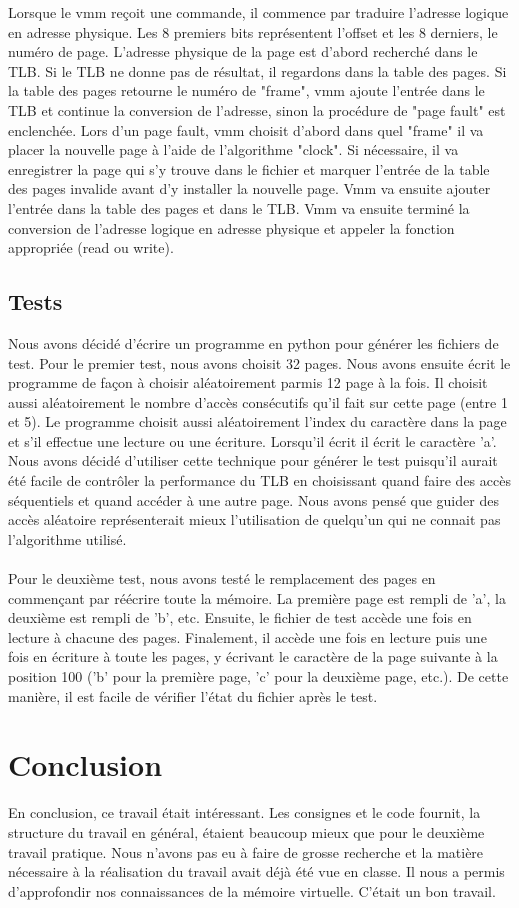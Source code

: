 \documentclass{article}
\begin{document}
Lorsque le vmm reçoit une commande, il commence par traduire l'adresse logique 
en adresse physique. Les 8 premiers bits représentent l'offset et les 8 
derniers, le numéro de page. L'adresse physique de la page est d'abord 
recherché dans le TLB. Si le TLB ne donne pas de résultat, il regardons dans 
la table des pages. Si la table des pages retourne le numéro de "frame", vmm 
ajoute l'entrée dans le TLB et continue la conversion de l'adresse, sinon la 
procédure de "page fault" est enclenchée. Lors d'un page fault, vmm choisit 
d'abord dans quel "frame" il va placer la nouvelle page à l'aide de 
l'algorithme "clock". Si nécessaire, il va enregistrer la page qui s'y trouve 
dans le fichier et marquer l'entrée de la table des pages invalide avant d'y 
installer la nouvelle page. Vmm va ensuite ajouter l'entrée dans la table des 
pages et dans le TLB. Vmm va ensuite terminé la conversion de l'adresse 
logique en adresse physique et appeler la fonction appropriée (read ou write).

\subsection{Tests}

Nous avons décidé d'écrire un programme en python pour générer les fichiers de 
test. Pour le premier test, nous avons choisit 32 pages. Nous avons ensuite 
écrit le programme de façon à choisir aléatoirement parmis 12 page à la fois. 
Il choisit aussi aléatoirement le nombre d'accès consécutifs qu'il fait sur 
cette page (entre 1 et 5). Le programme choisit aussi aléatoirement l'index du 
caractère dans la page et s'il effectue une lecture ou une écriture. Lorsqu'il 
écrit il écrit le caractère 'a'. Nous avons décidé d'utiliser cette technique 
pour générer le test puisqu'il aurait été facile de contrôler la performance 
du TLB en choisissant quand faire des accès séquentiels et quand accéder à une 
autre page. Nous avons pensé que guider des accès aléatoire représenterait 
mieux l'utilisation de quelqu'un qui ne connait pas l'algorithme utilisé.\\\\
Pour le deuxième test, nous avons testé le remplacement des pages en 
commençant par réécrire toute la mémoire. La première page est rempli de 'a', 
la deuxième est rempli de 'b', etc. Ensuite, le fichier de test accède une 
fois en lecture à chacune des pages. Finalement, il accède une fois en lecture 
puis une fois en écriture à toute les pages, y écrivant le caractère de la 
page suivante à la position 100 ('b' pour la première page, 'c' pour la 
deuxième page, etc.). De cette manière, il est facile de vérifier l'état du 
fichier après le test.


\section{Conclusion}
En conclusion, ce travail était intéressant. Les consignes et le code fournit, 
la structure du travail en général, étaient beaucoup mieux que pour le 
deuxième travail pratique. Nous n'avons pas eu à faire de grosse recherche et 
la matière nécessaire à la réalisation du travail avait déjà été vue en 
classe. Il nous a permis d'approfondir nos connaissances de la mémoire 
virtuelle. C'était un bon travail.
\end{document}
